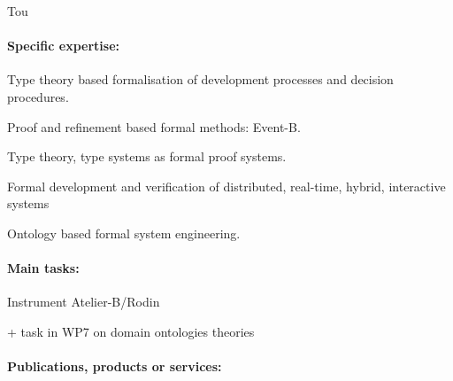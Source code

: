 \begin{sitedescription}{Tou}
\paragraph*{Specific expertise:} 

\begin{compactitem}
\item Type theory based formalisation of development processes and decision procedures. 
\item Proof and refinement based formal methods: Event-B. 
\item Type theory, type systems as formal proof systems. 
\item Formal development and verification of distributed, real-time, hybrid, interactive systems
\item Ontology based formal system engineering.
\end{compactitem}

\paragraph*{Main tasks:}

\begin{compactitem}
\item {} Instrument Atelier-B/Rodin
\item {\color{red} + task in WP7 on domain ontologies theories}
\end{compactitem}

\paragraph*{Publications, products or services:}


\end{sitedescription}

